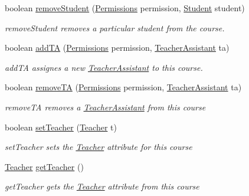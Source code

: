 \begin{CompactItemize}
boolean \hyperlink{classCourse_1ef5ef0c45209e94bc4c80e679a05ccd}{removeStudent} (\hyperlink{classPermissions}{Permissions} permission, \hyperlink{classStudent}{Student} student)
\begin{CompactList}\small\item\em removeStudent removes a particular student from the course. \item\end{CompactList}\item 
boolean \hyperlink{classCourse_fa902d10778aabf551c83b7330de82ee}{addTA} (\hyperlink{classPermissions}{Permissions} permission, \hyperlink{classTeacherAssistant}{TeacherAssistant} ta)
\begin{CompactList}\small\item\em addTA assignes a new \hyperlink{classTeacherAssistant}{TeacherAssistant} to this course. \item\end{CompactList}\item 
boolean \hyperlink{classCourse_75709fa5448678e86d780b1a9f6f73ad}{removeTA} (\hyperlink{classPermissions}{Permissions} permission, \hyperlink{classTeacherAssistant}{TeacherAssistant} ta)
\begin{CompactList}\small\item\em removeTA removes a \hyperlink{classTeacherAssistant}{TeacherAssistant} from this course \item\end{CompactList}\item 
boolean \hyperlink{classCourse_678a0261fead39c7bfca06b0e69fc419}{setTeacher} (\hyperlink{classTeacher}{Teacher} t)
\begin{CompactList}\small\item\em setTeacher sets the \hyperlink{classTeacher}{Teacher} attribute for this course \item\end{CompactList}\item 
\hyperlink{classTeacher}{Teacher} \hyperlink{classCourse_4bd27c4b74ec54cc76d13d9bb05f2e58}{getTeacher} ()
\begin{CompactList}\small\item\em getTeacher gets the \hyperlink{classTeacher}{Teacher} attribute from this course \item\end{CompactList}\end{CompactItemize}
